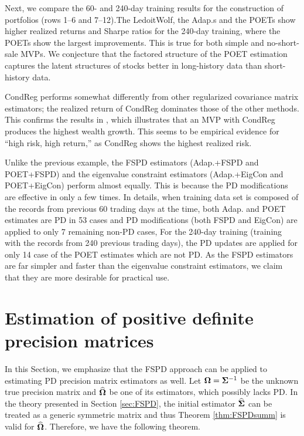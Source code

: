 \documentclass[times,sort&compress,3p]{elsarticle}
\begin{document}
Next, we compare the 60- and 240-day training results for the construction of portfolios (rows 1--6 and
7--12).The LedoitWolf, the Adap.s and the POETs show higher realized returns and
Sharpe ratios for the 240-day training, where the POETs show the largest improvements. This is true for both simple and no-short-sale MVPs. We conjecture that the
factored structure of the POET estimation captures the latent structures of stocks better in long-history data than
 short-history data.


CondReg performs somewhat differently from other regularized covariance matrix estimators; the realized return of CondReg
dominates those of the other methods. This confirms the results in \citet{Won2013}, which illustrates that an MVP with
 CondReg produces the highest wealth growth. This seems to be empirical evidence for ``high risk, high return,'' as CondReg
 shows the highest realized risk.
 
Unlike the previous example, the FSPD estimators (Adap.+FSPD and
 POET+FSPD) and the eigenvalue constraint estimators (Adap.+EigCon and POET+EigCon)
 perform almost equally.
This is because the PD modifications are effective in only a few times. In details, when training data set 
is composed of the records from previous 60 trading days at the time,  
both Adap. and POET estimates are PD in 53 cases 
and PD modifications (both FSPD and EigCon) are applied to only 7 remaining non-PD cases, For the 240-day training (training with
the records from 240 previous trading days), the PD updates are applied for only 14 case of the POET estimates which are not PD. 
As the FSPD estimators are far simpler and faster than the eigenvalue constraint
estimators, we claim that they are more desirable for practical use.


\section{Estimation of positive definite precision matrices}\label{sec:prec}


In this Section, we emphasize that the FSPD approach can be applied to estimating PD precision
matrix estimators as well. Let ${\bf \Omega} = {\bf \Sigma}^{-1}$ be the unknown true precision matrix and
$\widehat{\bf \Omega}$ be one of its estimators, which possibly lacks PD. In the theory presented in Section
 \ref{sec:FSPD}, the initial estimator $\widehat{\bf \Sigma}$ can be treated as a generic symmetric matrix and
 thus Theorem \ref{thm:FSPDsumm} is valid for $\widehat{\bf \Omega}$. Therefore, we have the following theorem.
\end{document}
